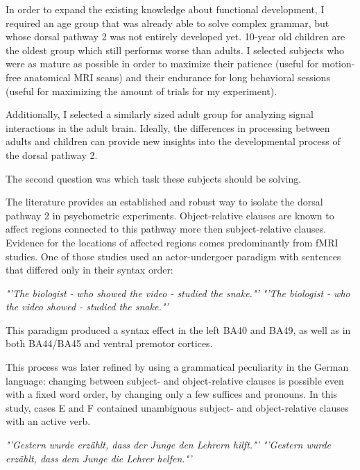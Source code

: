 In order to expand the existing knowledge about functional development, I required an age group that was already able to solve complex grammar, but whose dorsal pathway 2 was not entirely developed yet.
10-year old children are the oldest group which still performs worse than adults.
I selected subjects who were as mature as possible in order to maximize their patience (useful for motion-free anatomical MRI scans) and their endurance for long behavioral sessions (useful for maximizing the amount of trials for my experiment).

Additionally, I selected a similarly sized adult group for analyzing signal interactions in the adult brain.
Ideally, the differences in processing between adults and children can provide new insights into the developmental process of the dorsal pathway 2.


The second question was which task these subjects should be solving.

The literature provides an established and robust way to isolate the dorsal pathway 2 in psychometric experiments.
Object-relative clauses are known to affect regions connected to this pathway more then subject-relative clauses.
Evidence for the locations of affected regions comes predominantly from fMRI studies.
One of those studies \cite{1.3.Constable} used an actor-undergoer paradigm with sentences that differed only in their syntax order:


\begin{center}
\emph{"'The biologist - who showed the video - studied the snake."'}
\emph{"'The biologist - who the video showed - studied the snake."'}
\end{center}


This paradigm produced a syntax effect in the left BA40 and BA49, as well as in both BA44/BA45 and ventral premotor cortices.

This process was later refined \cite{1.3.Bornkessel} by using a grammatical peculiarity in the German language: changing between subject- and object-relative clauses is possible even with a fixed word order, by changing only a few suffices and pronouns.
In this study, cases E and F contained unambiguous subject- and object-relative clauses with an active verb.


\begin{center}
\emph{"'Gestern wurde erzählt, dass der Junge den Lehrern hilft."'}
\emph{"'Gestern wurde erzählt, dass dem Junge die Lehrer helfen."'}
\end{center}


